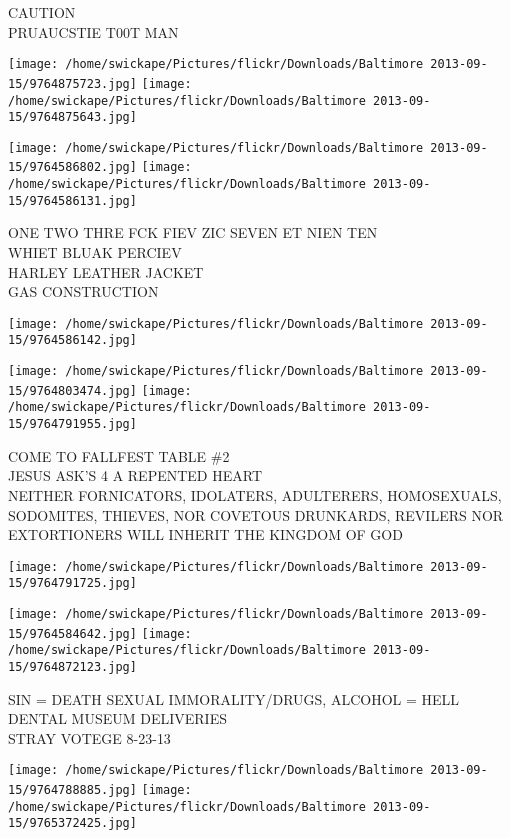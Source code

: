 \documentclass[10pt,letterpaper]{article}
\begin{document}
CAUTION\\
PRUAUCSTIE T00T MAN
\pagebreak

\texttt{[image: /home/swickape/Pictures/flickr/Downloads/Baltimore 2013-09-15/9764875723.jpg]}
\texttt{[image: /home/swickape/Pictures/flickr/Downloads/Baltimore 2013-09-15/9764875643.jpg]}

\texttt{[image: /home/swickape/Pictures/flickr/Downloads/Baltimore 2013-09-15/9764586802.jpg]}
\texttt{[image: /home/swickape/Pictures/flickr/Downloads/Baltimore 2013-09-15/9764586131.jpg]}

ONE TWO THRE FCK FIEV ZIC SEVEN ET NIEN TEN\\
WHIET BLUAK PERCIEV\\
HARLEY LEATHER JACKET\\
GAS CONSTRUCTION
\pagebreak

\texttt{[image: /home/swickape/Pictures/flickr/Downloads/Baltimore 2013-09-15/9764586142.jpg]}

\vspace{0.25in}
\texttt{[image: /home/swickape/Pictures/flickr/Downloads/Baltimore 2013-09-15/9764803474.jpg]}
\texttt{[image: /home/swickape/Pictures/flickr/Downloads/Baltimore 2013-09-15/9764791955.jpg]}

COME TO FALLFEST TABLE \#2\\
JESUS ASK'S 4 A REPENTED HEART\\
NEITHER FORNICATORS, IDOLATERS, ADULTERERS, HOMOSEXUALS, SODOMITES, THIEVES, NOR COVETOUS DRUNKARDS, REVILERS NOR EXTORTIONERS WILL INHERIT THE KINGDOM OF GOD
\pagebreak

\texttt{[image: /home/swickape/Pictures/flickr/Downloads/Baltimore 2013-09-15/9764791725.jpg]}

\vspace{0.25in}
\texttt{[image: /home/swickape/Pictures/flickr/Downloads/Baltimore 2013-09-15/9764584642.jpg]}
\texttt{[image: /home/swickape/Pictures/flickr/Downloads/Baltimore 2013-09-15/9764872123.jpg]}

SIN = DEATH SEXUAL IMMORALITY/DRUGS, ALCOHOL = HELL\\
DENTAL MUSEUM DELIVERIES\\
STRAY VOTEGE 8{-}23{-}13
\pagebreak

\texttt{[image: /home/swickape/Pictures/flickr/Downloads/Baltimore 2013-09-15/9764788885.jpg]}
\texttt{[image: /home/swickape/Pictures/flickr/Downloads/Baltimore 2013-09-15/9765372425.jpg]}
\end{document}
